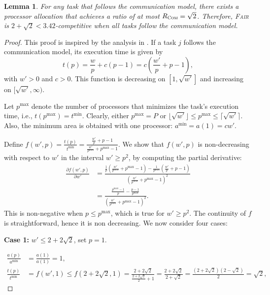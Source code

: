 \documentclass{article}
\newtheorem{lemma}{Lemma}
\newcommand\fair{\textsc{Fair}\xspace}
\newcommand\ratio{R\xspace}
\newcommand\COM{\textsc{Com}\xspace}
\begin{document}
\begin{lemma}\label{lem.comm}
For any task that follows the communication model, there exists a processor allocation that achieves a ratio of at most  $\ratio_{\COM} = \sqrt{2}$.  
Therefore, \fair is $2 + \sqrt{2} < 3.42$-competitive when all tasks follow the communication model.
\end{lemma}

\begin{proof}
This proof is inspired by the analysis in \cite{TOPC24}.  
If a task $j$ follows the communication model, its execution time is given by
\[
t(p) = \frac{w}{p} + c(p - 1) = c\left( \frac{w'}{p} + p - 1 \right),
\]
with $w' > 0$ and $c > 0$.  
This function is decreasing on $[1, \sqrt{w'}]$ and increasing on $[\sqrt{w'}, \infty)$.

Let $p^{\max}$ denote the number of processors that minimizes the task’s execution time, i.e., $t(p^{\max}) = t^{\min}$.  
Clearly, either $p^{\max} = P$ or $\lfloor \sqrt{w'} \rfloor \le p^{\max} \le \lceil \sqrt{w'} \rceil$.  
Also, the minimum area is obtained with one processor: $a^{\min} = a(1) = c w'$.

Define \(f(w', p) = \frac{t(p)}{t^{\min}} = \frac{\frac{w'}{p} + p - 1}{\frac{w'}{p^{\max}} + p^{\max} - 1}\).  
We show that \(f(w', p)\) is non-decreasing with respect to \(w'\) in the interval \(w' \ge p^2\), by computing the partial derivative:
\begin{align*}
\frac{\partial f(w', p)}{\partial w'} &= 
\frac{
  \frac{1}{p}\left(\frac{w'}{p^{\max}} + p^{\max} - 1\right)
  - \frac{1}{p^{\max}}\left(\frac{w'}{p} + p - 1\right)
}{
  \left( \frac{w'}{p^{\max}} + p^{\max} - 1 \right)^2
} \\
&= 
\frac{
  \frac{p^{\max} - 1}{p} - \frac{p - 1}{p^{\max}}
}{
  \left( \frac{w'}{p^{\max}} + p^{\max} - 1 \right)^2
}.
\end{align*}
This is non-negative when \(p \le p^{\max}\), which is true for \(w' \ge p^2\). The continuity of $f$ is straightforward, hence it is non decreasing. We now consider four cases:

\textbf{Case 1:} \(w' \le 2 + 2\sqrt{2}\), set \(p = 1\).

\begin{align*}
\frac{a(p)}{a^{\min}}
      &= \frac{a(1)}{a(1)}
       = 1,\\[4pt]
\frac{t(p)}{t^{\min}}&=f(w',1) \leq f(2+2\sqrt{2},1)=\frac{2+2\sqrt{2}}{\frac{2+2\sqrt{2}}{2}+1} =\frac{2+2\sqrt{2}}{2+\sqrt{2}}=\frac{(2+2\sqrt{2})(2-\sqrt{2})}{2}=\sqrt{2},
\end{align*}


\end{proof}
\end{document}
